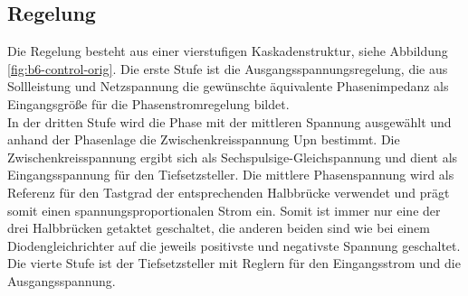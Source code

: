 		\subsection{Regelung}
			Die Regelung besteht aus einer vierstufigen Kaskadenstruktur, siehe Abbildung \ref{fig:b6-control-orig}. Die erste Stufe ist die Ausgangsspannungsregelung, die aus Sollleistung und Netzspannung die gewünschte äquivalente Phasenimpedanz als Eingangsgröße für die Phasenstromregelung bildet.\\
			In der dritten Stufe wird die Phase mit der mittleren Spannung ausgewählt und anhand der Phasenlage die Zwischenkreisspannung \gls{Upn} bestimmt. Die Zwischenkreisspannung ergibt sich als Sechspulsige-Gleichspannung und dient als Eingangsspannung für den Tiefsetzsteller. Die mittlere Phasenspannung wird als Referenz für den Tastgrad der entsprechenden Halbbrücke verwendet und prägt somit einen spannungsproportionalen Strom ein. Somit ist immer nur eine der drei Halbbrücken getaktet geschaltet, die anderen beiden sind wie bei einem Diodengleichrichter auf die jeweils positivste und negativste Spannung geschaltet.
			Die vierte Stufe ist der Tiefsetzsteller mit Reglern für den Eingangsstrom und die Ausgangsspannung.
				
